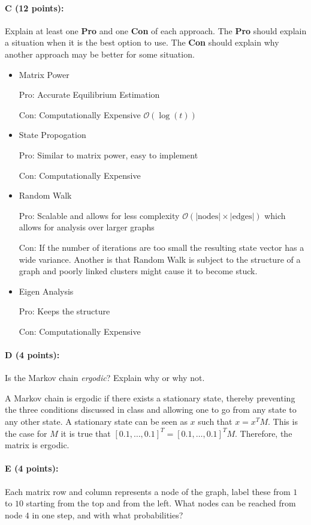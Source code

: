 \documentclass[11pt]{article}
\begin{document}
\paragraph{C (12 points):}
Explain at least one \textbf{Pro} and one \textbf{Con} of each approach.  
The \textbf{Pro} should explain a situation when it is the best option to use.  
The \textbf{Con} should explain why another approach may be better for some situation.  

\begin{itemize}
  \item Matrix Power

    Pro: Accurate Equilibrium Estimation

    Con: Computationally Expensive $\mathcal{O}(\log(t))$

  \item State Propogation

    Pro: Similar to matrix power, easy to implement

    Con: Computationally Expensive

  \item Random Walk

    Pro: Scalable and allows for less complexity $\mathcal{O}(\left|\text{nodes}\right|\times \left|\text{edges}\right|)$ which allows for analysis over larger graphs

    Con: If the number of iterations are too small the resulting state vector has a wide variance. Another is that Random Walk is subject to the structure of a graph and poorly linked clusters might cause it to become stuck.

    \item Eigen Analysis
      
      Pro: Keeps the structure

      Con: Computationally Expensive
\end{itemize}

\paragraph{D (4 points):}
Is the Markov chain \emph{ergodic}?  Explain why or why not.  

A Markov chain is ergodic if there exists a stationary state, thereby preventing the three conditions discussed in class and allowing one to go from any state to any other state. A stationary state can be seen as $x$ such that $x = x^{T}M$. This is the case for $M$ it is true that $[0.1,\ldots,0.1]^{T} = [0.1,\ldots,0.1]^{T}M$. Therefore, the matrix is ergodic.

\paragraph{E (4 points):}
Each matrix row and column represents a node of the graph, label these from $1$ to $10$ starting from the top and from the left.  
What nodes can be reached from node $4$ in one step, and with what probabilities?  
\end{document}
